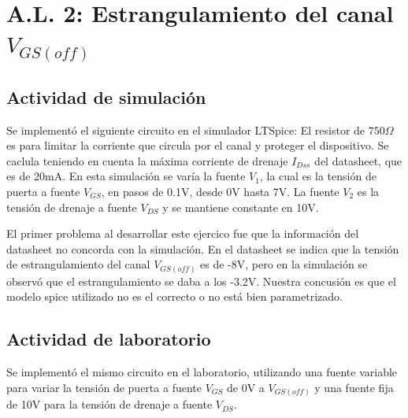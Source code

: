 \section{A.L. 2: Estrangulamiento del canal $V_{GS(off)}$}
\subsection{Actividad de simulación}\sangria{} Se implementó el siguiente circuito en el simulador LTSpice: 
\sangria{} El resistor de $750\Omega$ es para limitar la corriente que circula por el canal y proteger el dispositivo. Se caclula teniendo en cuenta la máxima corriente de drenaje $I_{Dss}$ del datasheet, que es de 20mA.
\sangria{} En esta simulación se varía la fuente $V_1$, la cual es la tensión de puerta a fuente $V_{GS}$, en pasos de 0.1V, desde 0V hasta 7V. La fuente $V_2$ es la tensión de drenaje a fuente $V_{DS}$ y se mantiene constante en 10V.

\sangria{} El primer problema al desarrollar este ejercico fue que la información del datasheet no concorda con la simulación. En el datasheet se indica que la tensión de estrangulamiento del canal $V_{GS(off)}$ es de -8V, pero en la simulación se observó que el estrangulamiento se daba a los -3.2V. Nuestra concusión es que el modelo spice utilizado no es el correcto o no está bien parametrizado.  
\subsection{Actividad de laboratorio}\sangria{} Se implementó el mismo circuito en el laboratorio, utilizando una fuente variable para variar la tensión de puerta a fuente $V_{GS}$ de 0V a $V_{GS(off)}$ y una fuente fija de 10V para la tensión de drenaje a fuente $V_{DS}$. 

